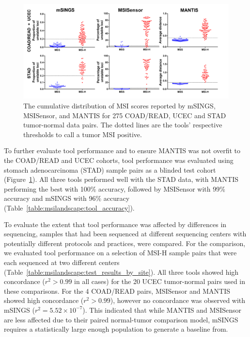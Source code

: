 \begin{figure}[htp]
	\centering
	\includegraphics[width=0.95\linewidth,keepaspectratio]{images/msilandscape/scores_dist_entire_cohort}
	\caption[Distribution of MSI scores reported by mSINGS, MSISensor, and MANTIS.]{The cumulative distribution of MSI scores reported by mSINGS, MSISensor, and MANTIS for 275 COAD/READ, UCEC and STAD tumor-normal data pairs. The dotted lines are the tools' respective thresholds to call a tumor MSI positive.}
	\label{fig:msilandscape:scores_dist_entire_cohort}
\end{figure}
To further evaluate tool performance and to ensure MANTIS was not overfit to the COAD/READ and UCEC cohorts, tool performance was evaluated using stomach adenocarcinoma (STAD) sample pairs as a blinded test cohort (Figure~\ref{fig:msilandscape:scores_dist_entire_cohort}). All three tools performed well with the STAD data, with MANTIS performing the best with 100\% accuracy, followed by MSISensor with 99\% accuracy and mSINGS with 96\% accuracy (Table~\ref{table:msilandscape:tool_accuracy}).

To evaluate the extent that tool performance was affected by differences in sequencing, samples that had been sequenced at different sequencing centers with potentially different protocols and practices, were compared. For the comparison, we evaluated tool performance on a selection of MSI-H sample pairs that were each sequenced at two different centers (Table~\ref{table:msilandscape:test_results_by_site}). All three tools showed high concordance ($r^2 > 0.99$ in all cases) for the 20 UCEC tumor-normal pairs used in these comparisons. For the 4 COAD/READ pairs, MSISensor and MANTIS showed high concordance ($r^2 > 0.99$), however no concordance was observed with mSINGS ($r^2 = 5.52 \times 10^{-7}$). This indicated that while MANTIS and MSISensor are less affected due to their paired normal-tumor comparison model, mSINGS requires a statistically large enough population to generate a baseline from.


